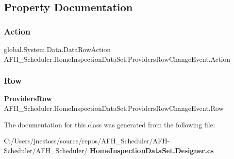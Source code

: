 \subsection{Property Documentation}
\mbox{\label{class_a_f_h___scheduler_1_1_home_inspection_data_set_1_1_providers_row_change_event_a5b7f6f675f2bdf5712bd964a687fb0e3}} 
\subsubsection{Action}
{\footnotesize\ttfamily global.\+System.\+Data.\+Data\+Row\+Action A\+F\+H\+\_\+\+Scheduler.\+Home\+Inspection\+Data\+Set.\+Providers\+Row\+Change\+Event.\+Action\hspace{0.3cm}{\ttfamily [get]}}

\mbox{\label{class_a_f_h___scheduler_1_1_home_inspection_data_set_1_1_providers_row_change_event_a525473a69652d2c78c48ec2b4ce54b0d}} 
\subsubsection{Row}
{\footnotesize\ttfamily \textbf{ Providers\+Row} A\+F\+H\+\_\+\+Scheduler.\+Home\+Inspection\+Data\+Set.\+Providers\+Row\+Change\+Event.\+Row\hspace{0.3cm}{\ttfamily [get]}}



The documentation for this class was generated from the following file\+:\begin{DoxyCompactItemize}
\item 
C\+:/\+Users/jnestoss/source/repos/\+A\+F\+H\+\_\+\+Scheduler/\+A\+F\+H-\/\+Scheduler/\+A\+F\+H\+\_\+\+Scheduler/\textbf{ Home\+Inspection\+Data\+Set.\+Designer.\+cs}\end{DoxyCompactItemize}
